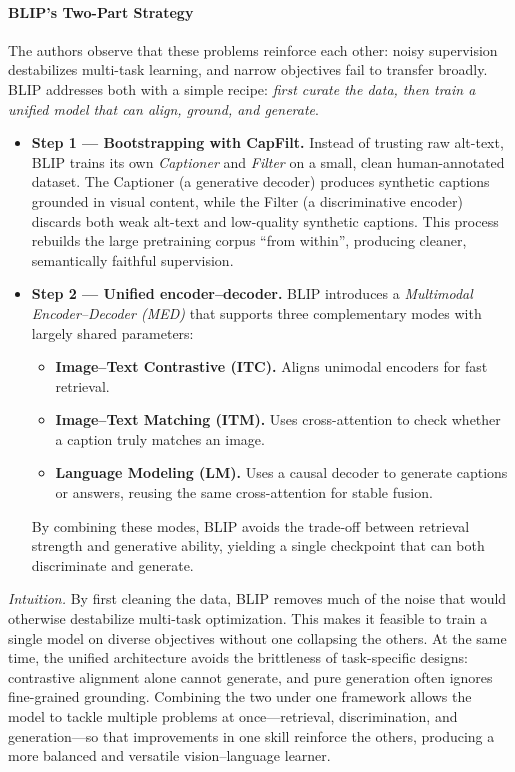 \begin{enrichment}
\begin{enrichment}
        \paragraph{BLIP’s Two-Part Strategy}
        The authors observe that these problems reinforce each other: noisy supervision destabilizes multi-task learning, and narrow objectives fail to transfer broadly. BLIP addresses both with a simple recipe: \emph{first curate the data, then train a unified model that can align, ground, and generate}.
        \begin{itemize}
            \item \textbf{Step 1 — Bootstrapping with CapFilt.}  
            Instead of trusting raw alt-text, BLIP trains its own \emph{Captioner} and \emph{Filter} on a small, clean human-annotated dataset. The Captioner (a generative decoder) produces synthetic captions grounded in visual content, while the Filter (a discriminative encoder) discards both weak alt-text and low-quality synthetic captions. This process rebuilds the large pretraining corpus “from within”, producing cleaner, semantically faithful supervision.
            \item \textbf{Step 2 — Unified encoder--decoder.}  
            BLIP introduces a \emph{Multimodal Encoder--Decoder (MED)} that supports three complementary modes with largely shared parameters:
            \begin{itemize}
                \item \textbf{Image--Text Contrastive (ITC).} Aligns unimodal encoders for fast retrieval.
                \item \textbf{Image--Text Matching (ITM).} Uses cross-attention to check whether a caption truly matches an image.
                \item \textbf{Language Modeling (LM).} Uses a causal decoder to generate captions or answers, reusing the same cross-attention for stable fusion.
            \end{itemize}
            By combining these modes, BLIP avoids the trade-off between retrieval strength and generative ability, yielding a single checkpoint that can both discriminate and generate.
        \end{itemize}
        
        \medskip
        
        \emph{Intuition.} By first cleaning the data, BLIP removes much of the noise that would otherwise destabilize multi-task optimization. This makes it feasible to train a single model on diverse objectives without one collapsing the others. At the same time, the unified architecture avoids the brittleness of task-specific designs: contrastive alignment alone cannot generate, and pure generation often ignores fine-grained grounding. Combining the two under one framework allows the model to tackle multiple problems at once—retrieval, discrimination, and generation—so that improvements in one skill reinforce the others, producing a more balanced and versatile vision--language learner.
        

\end{enrichment}
\end{enrichment}
